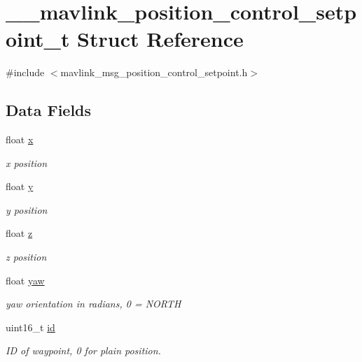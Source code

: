 \hypertarget{struct____mavlink__position__control__setpoint__t}{\section{\+\_\+\+\_\+mavlink\+\_\+position\+\_\+control\+\_\+setpoint\+\_\+t Struct Reference}
\label{struct____mavlink__position__control__setpoint__t}
}


{\ttfamily \#include $<$mavlink\+\_\+msg\+\_\+position\+\_\+control\+\_\+setpoint.\+h$>$}

\subsection*{Data Fields}
\begin{DoxyCompactItemize}
\item 
float \hyperlink{struct____mavlink__position__control__setpoint__t_af474c7cae445b05fa8e4fe96a79ba880}{x}
\begin{DoxyCompactList}\small\item\em x position \end{DoxyCompactList}\item 
float \hyperlink{struct____mavlink__position__control__setpoint__t_aadce2a9a984dbaadd51556ba85bbbdb2}{y}
\begin{DoxyCompactList}\small\item\em y position \end{DoxyCompactList}\item 
float \hyperlink{struct____mavlink__position__control__setpoint__t_a5ff703f66c6213db9cf85ab644c85538}{z}
\begin{DoxyCompactList}\small\item\em z position \end{DoxyCompactList}\item 
float \hyperlink{struct____mavlink__position__control__setpoint__t_a565a4aa5cce78efacdda249161e3ee2d}{yaw}
\begin{DoxyCompactList}\small\item\em yaw orientation in radians, 0 = N\+O\+R\+T\+H \end{DoxyCompactList}\item 
uint16\+\_\+t \hyperlink{struct____mavlink__position__control__setpoint__t_ae1c4982fa549c010060a1de4cbb534a7}{id}
\begin{DoxyCompactList}\small\item\em I\+D of waypoint, 0 for plain position. \end{DoxyCompactList}\end{DoxyCompactItemize}


